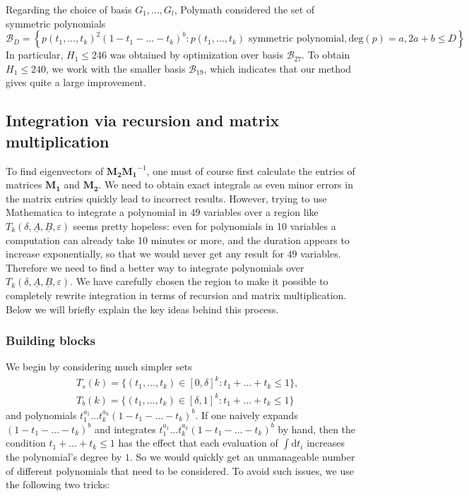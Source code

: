 \documentclass{amsart}
\numberwithin{equation}{section}
\begin{document}
\medskip 

Regarding the choice of basis $G_1, \dots, G_l$, Polymath considered the set of symmetric polynomials   $$ \mathcal{B}_D=\left\{   p(t_1, \dots, t_k)^2 (1-t_1-\dots-t_k)^b :  p(t_1, \dots, t_k) \mbox{ symmetric polynomial}, \mbox{deg}(p)=a,   2a+b \leq D \right\}.$$ In particular, $H_1 \leq 246$ was obtained by optimization over  basis $\mathcal{B}_{27}$. To obtain $H_1 \leq 240$, we  work with the smaller basis $\mathcal{B}_{19}$, which indicates that our method gives quite a large improvement.
   
\subsection{Integration via recursion and matrix multiplication} 
  
To find eigenvectors of  $\mathbf{M_2} \mathbf{M_1}^{-1}$, one  must of course first   calculate the entries of matrices $\mathbf{M_1}$ and $\mathbf{M_2}$. We need to obtain exact integrals as even minor errors in the matrix entries quickly lead to incorrect results. However, trying to use Mathematica to integrate a polynomial in $49$ variables over a region like $T_k(\delta,\underline{A},\underline{B},\varepsilon)$ seems pretty hopeless: even for   polynomials  in 10 variables a computation can already take 10 minutes or more, and the duration appears to increase exponentially, so that we would never get any result for $49$ variables. Therefore we need to find a better way to integrate polynomials over $T_k(\delta,\underline{A},\underline{B},\varepsilon)$. We have carefully chosen the region to make it possible to completely rewrite integration   in terms of recursion and matrix multiplication. Below we will briefly explain the key ideas behind this process.  

\subsubsection{Building blocks}
   We begin by  considering much simpler sets 
 \begin{align*} 
 &T_s(k)=\{(t_1, \dots, t_k) \in [0,\delta]^k: t_1+\dots+t_k \leq 1\}, \\ 
 &T_b(k)=\{(t_1, \dots, t_k) \in [\delta,1]^k: t_1+\dots+t_k \leq 1\} 
  \end{align*} 
 and polynomials $ t_1^{a_1} \dots t_k^{a_k} (1-t_1-\dots-t_k)^b$.  If one naively  expands $(1-t_1-\dots-t_k)^b$ and integrates $ t_1^{a_1} \dots t_k^{a_k} (1-t_1-\dots-t_k)^b$ by hand, then the condition $t_1+\dots+t_k \leq 1$ has the effect that each evaluation of $\int\mbox{d}t_i$ increases the polynomial's degree by $1$. So we would quickly get an unmanageable number of different polynomials that need to be considered. To avoid such issues,   we use the following two tricks: 
\end{document}
